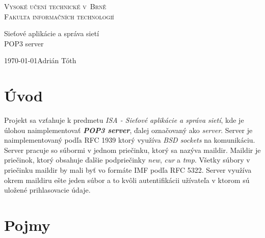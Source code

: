 \documentclass[11pt,a4paper]{article}
\begin{document}

\begin{titlepage}

\begin{center}

	\thispagestyle{empty}

	\textsc {
		\Huge Vysoké učení technické v~Brně\\[0.4em]
		\huge Fakulta informačních technologií
	}\\


	{
		\LARGE Sieťové aplikácie a správa sietí\\[0.4em]
		\Huge POP3 server
	}


\end{center}

	{
		\LARGE \today \hfill Adrián Tóth
	}

\end{titlepage}	

\setlength{\parskip}{0pt}
{\hypersetup{hidelinks}\tableofcontents}
\setlength{\parskip}{0pt}

\newpage %

\section{Úvod}
Projekt sa vzťahuje k predmetu \textit{ISA - Sieťové aplikácie a správa sietí}, kde je úlohou naimplementovať \textbf{\textit{POP3 server}}, ďalej označovaný ako \textit{server}. Server je naimplementovaný podľa RFC 1939 ktorý využíva \textit{BSD sockets} na komunikáciu. Server pracuje so súbormi v jednom priečinku, ktorý sa nazýva maildir. Maildir je priečinok, ktorý obsahuje ďalšie podpriečinky \textit{new}, \textit{cur} a \textit{tmp}. Všetky súbory v priečinku maildir by mali byť vo formáte IMF podľa RFC 5322. Server využíva okrem maildiru ešte jeden súbor a to kvôli autentifikácii užívateľa v ktorom sú uložené prihlasovacie údaje.

\section{Pojmy}
\end{document}
